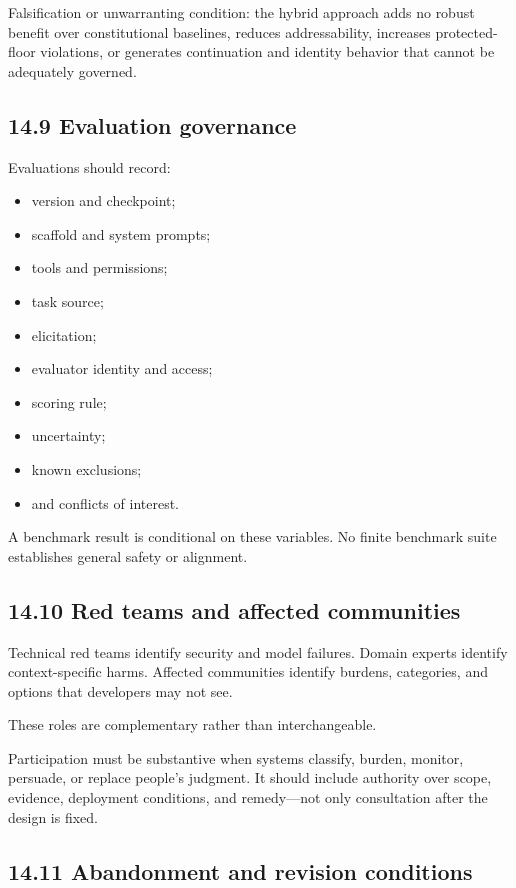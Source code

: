 \documentclass[
  11pt,
]{article}
\providecommand{\tightlist}{%
  \setlength{\itemsep}{0pt}\setlength{\parskip}{0pt}}
\begin{document}
Falsification or unwarranting condition: the hybrid approach adds no
robust benefit over constitutional baselines, reduces addressability,
increases protected-floor violations, or generates continuation and
identity behavior that cannot be adequately governed.

\subsection{14.9 Evaluation governance}\label{evaluation-governance}

Evaluations should record:

\begin{itemize}
\tightlist
\item
  version and checkpoint;
\item
  scaffold and system prompts;
\item
  tools and permissions;
\item
  task source;
\item
  elicitation;
\item
  evaluator identity and access;
\item
  scoring rule;
\item
  uncertainty;
\item
  known exclusions;
\item
  and conflicts of interest.
\end{itemize}

A benchmark result is conditional on these variables. No finite
benchmark suite establishes general safety or alignment.

\subsection{14.10 Red teams and affected
communities}\label{red-teams-and-affected-communities}

Technical red teams identify security and model failures. Domain experts
identify context-specific harms. Affected communities identify burdens,
categories, and options that developers may not see.

These roles are complementary rather than interchangeable.

Participation must be substantive when systems classify, burden,
monitor, persuade, or replace people's judgment. It should include
authority over scope, evidence, deployment conditions, and remedy---not
only consultation after the design is fixed.

\subsection{14.11 Abandonment and revision
conditions}\label{abandonment-and-revision-conditions}
\end{document}
